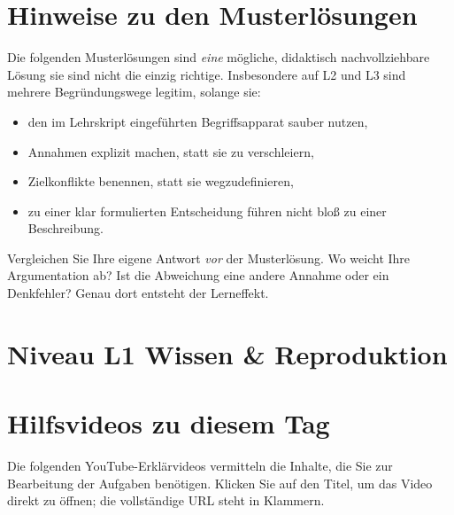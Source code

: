 \documentclass[11pt,a4paper,oneside]{article}
\begin{document}
\section*{Hinweise zu den Musterlösungen}
\thispagestyle{plain}

\noindent Die folgenden Musterlösungen sind \emph{eine} mögliche, didaktisch nachvollziehbare Lösung \textendash{} sie sind nicht die einzig richtige. Insbesondere auf L2 und L3 sind mehrere Begründungswege legitim, solange sie:

\begin{itemize}
  \item den im Lehrskript eingeführten Begriffsapparat sauber nutzen,
  \item Annahmen explizit machen, statt sie zu verschleiern,
  \item Zielkonflikte benennen, statt sie wegzudefinieren,
  \item zu einer klar formulierten Entscheidung führen \textendash{} nicht bloß zu einer Beschreibung.
\end{itemize}

\begin{infobox}
Vergleichen Sie Ihre eigene Antwort \emph{vor} der Musterlösung. Wo weicht Ihre Argumentation ab? Ist die Abweichung eine andere Annahme \textendash{} oder ein Denkfehler? Genau dort entsteht der Lerneffekt.
\end{infobox}

\clearpage

\section*{Niveau L1 \textendash{} Wissen \& Reproduktion}

\section*{Hilfsvideos zu diesem Tag}
\thispagestyle{plain}

\noindent Die folgenden YouTube-Erkl\"arvideos vermitteln die Inhalte, die Sie zur Bearbeitung der Aufgaben ben\"otigen. Klicken Sie auf den Titel, um das Video direkt zu \"offnen; die vollst\"andige URL steht in Klammern.
\end{document}
